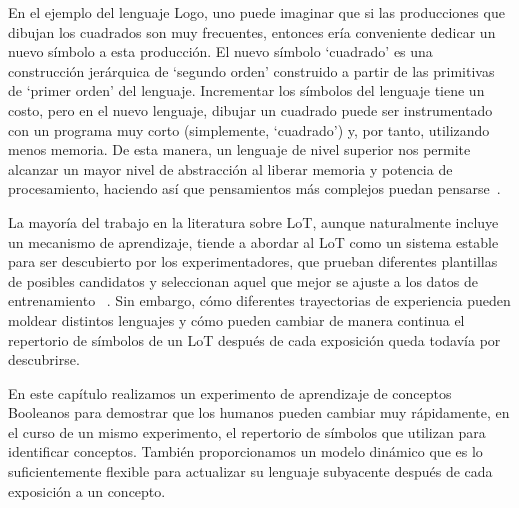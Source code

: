 En el ejemplo del lenguaje Logo, uno puede imaginar que si las producciones que dibujan los cuadrados son muy frecuentes, entonces ería conveniente dedicar un nuevo símbolo a esta producción. El nuevo símbolo `cuadrado' es una construcción jerárquica de `segundo orden' construido a partir de las primitivas de `primer orden' del lenguaje. Incrementar los símbolos del lenguaje tiene un costo, pero en el nuevo lenguaje, dibujar un cuadrado puede ser instrumentado con un programa muy corto (simplemente, `cuadrado') y, por tanto, utilizando menos memoria. De esta manera, un lenguaje de nivel superior nos permite alcanzar un mayor nivel de abstracción al liberar memoria y potencia de procesamiento, haciendo así que pensamientos más complejos puedan pensarse~\cite{minsky1967computation,murphy1988comprehending}.


La mayoría del trabajo en la literatura sobre LoT, aunque naturalmente incluye un mecanismo de aprendizaje, tiende a abordar al LoT como un sistema estable para ser descubierto por los experimentadores, que prueban diferentes plantillas de posibles candidatos y seleccionan aquel que mejor se ajuste a los datos de entrenamiento ~\cite{goodman2008rational,kemp2012exploring,piantadosi2016logical}. Sin embargo, cómo diferentes trayectorias de experiencia pueden moldear distintos lenguajes y cómo pueden cambiar de manera continua el repertorio de símbolos de un LoT después de cada exposición queda todavía por descubrirse.


En este capítulo realizamos un experimento de aprendizaje de conceptos Booleanos para demostrar que los humanos pueden cambiar muy rápidamente, en el curso de un mismo experimento, el repertorio de símbolos que utilizan para identificar conceptos. También proporcionamos un modelo dinámico que es lo suficientemente flexible para actualizar su lenguaje subyacente después de cada exposición a un concepto.

